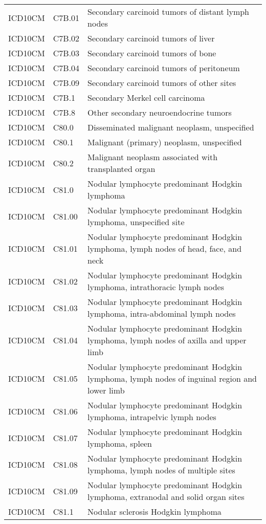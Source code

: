 \begin{longtable}{p{}p{}p{}}
  ICD10CM & C7B.01 & Secondary carcinoid tumors of distant lymph nodes \\ 
  ICD10CM & C7B.02 & Secondary carcinoid tumors of liver \\ 
  ICD10CM & C7B.03 & Secondary carcinoid tumors of bone \\ 
  ICD10CM & C7B.04 & Secondary carcinoid tumors of peritoneum \\ 
  ICD10CM & C7B.09 & Secondary carcinoid tumors of other sites \\ 
  ICD10CM & C7B.1 & Secondary Merkel cell carcinoma \\ 
  ICD10CM & C7B.8 & Other secondary neuroendocrine tumors \\ 
  ICD10CM & C80.0 & Disseminated malignant neoplasm, unspecified \\ 
  ICD10CM & C80.1 & Malignant (primary) neoplasm, unspecified \\ 
  ICD10CM & C80.2 & Malignant neoplasm associated with transplanted organ \\ 
  ICD10CM & C81.0 & Nodular lymphocyte predominant Hodgkin lymphoma \\ 
  ICD10CM & C81.00 & Nodular lymphocyte predominant Hodgkin lymphoma, unspecified site \\ 
  ICD10CM & C81.01 & Nodular lymphocyte predominant Hodgkin lymphoma, lymph nodes of head, face, and neck \\ 
  ICD10CM & C81.02 & Nodular lymphocyte predominant Hodgkin lymphoma, intrathoracic lymph nodes \\ 
  ICD10CM & C81.03 & Nodular lymphocyte predominant Hodgkin lymphoma, intra-abdominal lymph nodes \\ 
  ICD10CM & C81.04 & Nodular lymphocyte predominant Hodgkin lymphoma, lymph nodes of axilla and upper limb \\ 
  ICD10CM & C81.05 & Nodular lymphocyte predominant Hodgkin lymphoma, lymph nodes of inguinal region and lower limb \\ 
  ICD10CM & C81.06 & Nodular lymphocyte predominant Hodgkin lymphoma, intrapelvic lymph nodes \\ 
  ICD10CM & C81.07 & Nodular lymphocyte predominant Hodgkin lymphoma, spleen \\ 
  ICD10CM & C81.08 & Nodular lymphocyte predominant Hodgkin lymphoma, lymph nodes of multiple sites \\ 
  ICD10CM & C81.09 & Nodular lymphocyte predominant Hodgkin lymphoma, extranodal and solid organ sites \\ 
  ICD10CM & C81.1 & Nodular sclerosis Hodgkin lymphoma \\ 

\end{longtable}
